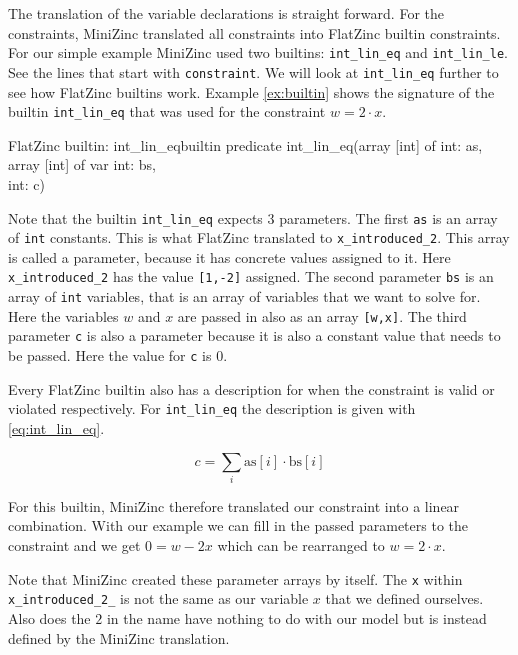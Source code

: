 The translation of the variable declarations is straight forward. For the constraints, MiniZinc translated all constraints into FlatZinc builtin constraints. For our simple example MiniZinc used two builtins: \verb|int_lin_eq| and \verb|int_lin_le|. See the lines that start with \verb|constraint|. We will look at \verb|int_lin_eq| further to see how FlatZinc builtins work. Example \ref{ex:builtin} shows the signature of the builtin \verb|int_lin_eq| that was used for the constraint $w = 2 \cdot x$. \\

\begin{example}{FlatZinc builtin: int\_lin\_eq}{builtin}
	predicate int\_lin\_eq(array [int] of int: as,\\
	\null \hspace*{2.95cm} array [int] of var int: bs,\\
	\null \hspace*{2.95cm} int: c)
\end{example}

Note that the builtin \verb|int_lin_eq| expects 3 parameters. The first \verb|as| is an array of \verb|int| constants. This is what FlatZinc translated to \verb|x_introduced_2|. This array is called a parameter, because it has concrete values assigned to it. Here \verb|x_introduced_2| has the value \verb|[1,-2]| assigned. The second parameter \verb|bs| is an array of \verb|int| variables, that is an array of variables that we want to solve for. Here the variables $w$ and $x$ are passed in also as an array \verb|[w,x]|. The third parameter \verb|c| is also a parameter because it is also a constant value that needs to be passed. Here the value for \verb|c| is $0$.

Every FlatZinc builtin also has a description for when the constraint is valid or violated respectively. For \verb|int_lin_eq| the description is given with \cref{eq:int_lin_eq}.

\begin{equation} \label{eq:int_lin_eq}
	c = \sum_{i} \text{as}[i] \cdot \text{bs}[i]
\end{equation}

For this builtin, MiniZinc therefore translated our constraint into a linear combination. With our example we can fill in the passed parameters to the constraint and we get $0 = w - 2x$ which can be rearranged to $w = 2 \cdot x$.

Note that MiniZinc created these parameter arrays by itself. The \verb|x| within \verb|x_introduced_2_| is not the same as our variable $x$ that we defined ourselves. Also does the $2$ in the name have nothing to do with our model but is instead defined by the MiniZinc translation.

